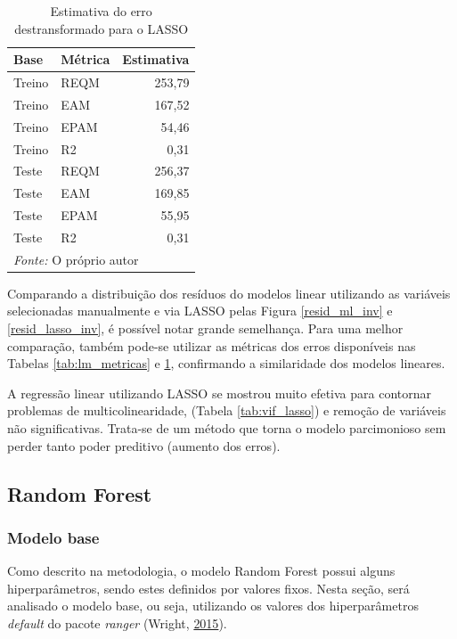 \documentclass[
	12pt,				%
	a4paper,		%
	oneside,    %
	chapter=TITLE,		   %
	section=TITLE,		   %
	subsection=TITLE,	   %
	subsubsection=TITLE, %
	english,			%
	french,				%
	spanish,			%
	brazil,				%
]{abntex2}
\begin{document}
\begin{table}

\caption{\label{tab:lasso_metricas}Estimativa do erro destransformado para o LASSO}
\centering
\begin{tabular}[t]{l|l|r}
\hline
Base & Métrica & Estimativa\\
\hline
Treino & REQM & 253,79\\
\hline
Treino & EAM & 167,52\\
\hline
Treino & EPAM & 54,46\\
\hline
Treino & R2 & 0,31\\
\hline
Teste & REQM & 256,37\\
\hline
Teste & EAM & 169,85\\
\hline
Teste & EPAM & 55,95\\
\hline
Teste & R2 & 0,31\\
\hline
\multicolumn{3}{l}{\textit{Fonte: } O próprio autor}\\
\end{tabular}
\end{table}

Comparando a distribuição dos resíduos do modelos linear utilizando as
variáveis selecionadas manualmente e via LASSO pelas Figura
\ref{resid_ml_inv} e \ref{resid_lasso_inv}, é possível notar grande
semelhança. Para uma melhor comparação, também pode-se utilizar as
métricas dos erros disponíveis nas Tabelas \ref{tab:lm_metricas} e
\ref{tab:lasso_metricas}, confirmando a similaridade dos modelos
lineares.

A regressão linear utilizando LASSO se mostrou muito efetiva para
contornar problemas de multicolinearidade, (Tabela \ref{tab:vif_lasso})
e remoção de variáveis não significativas. Trata-se de um método que
torna o modelo parcimonioso sem perder tanto poder preditivo (aumento
dos erros).

\hypertarget{random-forest}{%
\subsection{Random Forest}\label{random-forest}}

\hypertarget{modelo-base}{%
\subsubsection{Modelo base}\label{modelo-base}}

Como descrito na metodologia, o modelo Random Forest possui alguns
hiperparâmetros, sendo estes definidos por valores fixos. Nesta seção,
será analisado o modelo base, ou seja, utilizando os valores dos
hiperparâmetros \emph{default} do pacote \emph{ranger} (Wright,
\protect\hyperlink{ref-wright2015ranger}{2015}).
\end{document}

